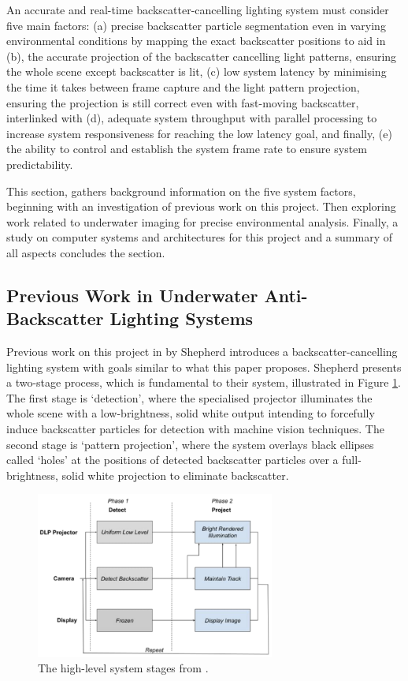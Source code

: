 An accurate and real-time backscatter-cancelling lighting system must consider five main factors: (a) precise backscatter particle segmentation even in varying environmental conditions by mapping the exact backscatter positions to aid in (b), the accurate projection of the backscatter cancelling light patterns, ensuring the whole scene except backscatter is lit, (c) low system latency by minimising the time it takes between frame capture and the light pattern projection, ensuring the projection is still correct even with fast-moving backscatter, interlinked with (d), adequate system throughput with parallel processing to increase system responsiveness for reaching the low latency goal, and finally, (e) the ability to control and establish the system frame rate to ensure system predictability.

This section, gathers background information on the five system factors, beginning with an investigation of previous work on this project. Then exploring work related to underwater imaging for precise environmental analysis. Finally, a study on computer systems and architectures for this project and a summary of all aspects concludes the section.

\subsection{Previous Work in Underwater Anti-Backscatter Lighting Systems}
\label{prevwork}

Previous work on this project in \cite{katieshepherdMachineVisionBased2023} by Shepherd introduces a backscatter-cancelling lighting system with goals similar to what this paper proposes. Shepherd presents a two-stage process, which is fundamental to their system, illustrated in Figure \ref{fig:shepherd_system_stages}. The first stage is `detection', where the specialised projector illuminates the whole scene with a low-brightness, solid white output intending to forcefully induce backscatter particles for detection with machine vision techniques. The second stage is `pattern projection', where the system overlays black ellipses called `holes' at the positions of detected backscatter particles over a full-brightness, solid white projection to eliminate backscatter.

\begin{figure}[H]
    \centering
    \includegraphics[width=0.7\textwidth]{assets/shepherd_fig6_system.png}
    \caption{The high-level system stages from \cite{katieshepherdMachineVisionBased2023}.}
    \label{fig:shepherd_system_stages}
\end{figure}

